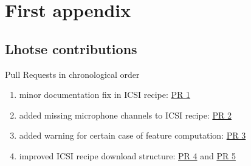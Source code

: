 \documentclass[bsc,frontabs,parskip,deptreport]{infthesis}
\begin{document}
\chapter{First appendix}

\section{Lhotse contributions} \label{app:lhotse-contrib}
Pull Requests in chronological order 
\begin{enumerate}
    \item minor documentation fix in ICSI recipe: \href{https://github.com/lhotse-speech/lhotse/pull/544}{PR 1}
    \item added missing microphone channels to ICSI recipe: \href{https://github.com/lhotse-speech/lhotse/pull/555}{PR 2}
    \item added warning for certain case of feature computation: \href{https://github.com/lhotse-speech/lhotse/pull/561}{PR 3}
    \item improved ICSI recipe download structure: \href{https://github.com/lhotse-speech/lhotse/pull/583}{PR 4} and \href{https://github.com/lhotse-speech/lhotse/pull/592}{PR 5}
\end{enumerate}
%
\end{document}
